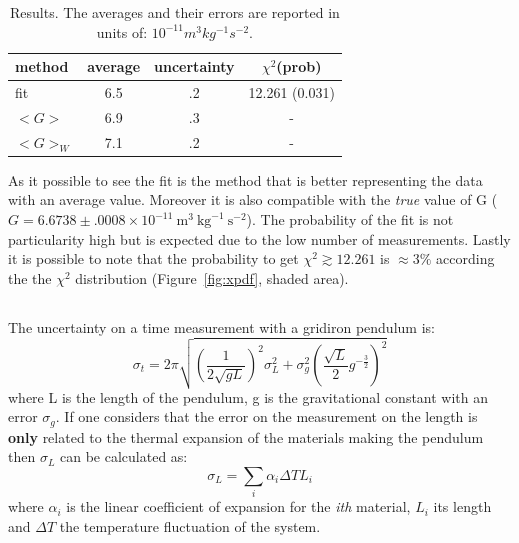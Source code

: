 \documentclass[twocolumn]{article}
\begin{document}
		\begin{table}[htpb]
			\caption{Results. The averages and their errors are reported in units of: $10^{-11} m^3 kg^{-1} s^{-2}$.}
			\label{tab:res}
			\begin{center}
				\begin{tabular}{l|ccc}
				\hline

				\hline
				\textbf{method} & \textbf{average} & \textbf{uncertainty} & \textbf{$\chi ^2 $(prob)} \\
				\hline
				fit & 6.5 & .2 & 12.261 (0.031) \\
				$<G> $ & 6.9 & .3 & - \\
				$<G>_W$ &  7.1 & .2 & - \\
				\hline
				\hline
				\end{tabular}
			\end{center}
		\end{table}
		As it possible to see the fit is the method that is better representing the data with an average value.
		Moreover it is also compatible with the \emph{true} value of G ($ G = 6.6738 \pm .0008  \times 10^{-11} \ \mbox{m}^3 \ \mbox{kg}^{-1} \ \mbox{s}^{-2} $).
		The probability of the fit is not particularity high but is expected due to the low number of measurements.
		Lastly it is possible to note that the probability to get $\chi ^2 \gtrsim 12.261 $ is $ \approx 3 \% $ according the the $\chi ^2$ distribution (Figure~\ref{fig:xpdf}, shaded area).
	\subsection{} %
	\label{sub:gridiron}
		The uncertainty on a time measurement with a gridiron pendulum is:
		\begin{equation}
			\sigma_t  = 2 \pi \sqrt{ (\frac{1}{2 \sqrt{g L }} ) ^{2} \sigma_L ^2 +
			\sigma_g ^2 (\frac{\sqrt{L}}{2} g^{-\frac{3}{2}})^2
			}
		\end{equation}
		where L is the length of the pendulum, g is the gravitational constant with an error $\sigma_g$.
		If one considers that the error on the measurement on the length is \textbf{only} related to the thermal expansion of the materials making the pendulum then $\sigma_L$ can be calculated as:
		\begin{equation}
			\sigma_L = \sum_i \alpha_i  \Delta T  L_i
		\end{equation}
		where $\alpha_i$ is the linear coefficient of expansion for the \emph{ith} material, $L_i$ its length and $\Delta T $ the temperature fluctuation of the system.
\end{document}
